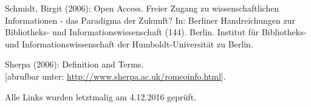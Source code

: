 \documentclass[a4paper,
fontsize=11pt,
oneside,
numbers=noperiodatend,
parskip=half-,
bibliography=totoc,
final
]{scrartcl}
\begin{document}
Schmidt, Birgit (2006): Open Access. Freier Zugang zu wissenschaftlichen
Informationen - das Paradigma der Zukunft? In: Berliner Handreichungen
zur Bibliotheks- und Informationswissenschaft (144). Berlin. Institut
für Bibliotheks- und Informationswissenschaft der Humboldt-Universität
zu Berlin.

Sherpa (2006): Definition and Terms.\\
{[}abrufbar unter: \url{http://www.sherpa.ac.uk/romeoinfo.html}{]}.

Alle Links wurden letztmalig am 4.12.2016 geprüft.

\end{document}
